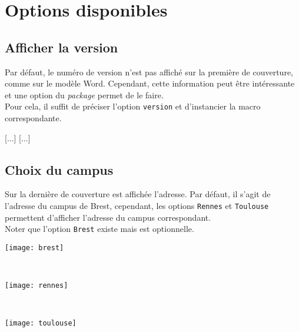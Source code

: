 \section{Options disponibles}
\subsection{Afficher la version}
\label{optionversion}

Par défaut, le numéro de version n'est pas affiché sur la première de couverture, comme sur le modèle Word. Cependant, cette information peut être intéressante et une option du \textit{package} permet de le faire. \\

Pour cela, il suffit de préciser l'option \texttt{version} et d'instancier la macro correspondante.

\begin{latex}
\usepackage[version]{telecom}
[...]
[...]

\end{latex}

\subsection{Choix du campus}
\label{optioncampus}

Sur la dernière de couverture est affichée l'adresse. Par défaut, il s'agit de l'adresse du campus de Brest, cependant, les options \texttt{Rennes} et \texttt{Toulouse} permettent d'afficher l'adresse du campus correspondant. \\
Noter que l'option \texttt{Brest} existe mais est optionnelle.\\

\begin{minipage}[c]{0.6\textwidth}
\begin{latex}
\usepackage{telecom}
\end{latex}
\end{minipage}
\vrule\begin{minipage}[c]{0.4\textwidth}
\centering\texttt{[image: brest]}
\end{minipage}\\

\begin{minipage}[c]{0.6\textwidth}
\begin{latex}
\usepackage[Rennes]{telecom}
\end{latex}
\end{minipage}
\vrule\begin{minipage}[c]{0.4\textwidth}
\centering\texttt{[image: rennes]}
\end{minipage}\\

\begin{minipage}[c]{0.6\textwidth}
\begin{latex}
\usepackage[Toulouse]{telecom}
\end{latex}
\end{minipage}
\vrule\begin{minipage}[c]{0.4\textwidth}
\centering\texttt{[image: toulouse]}
\end{minipage}\\
